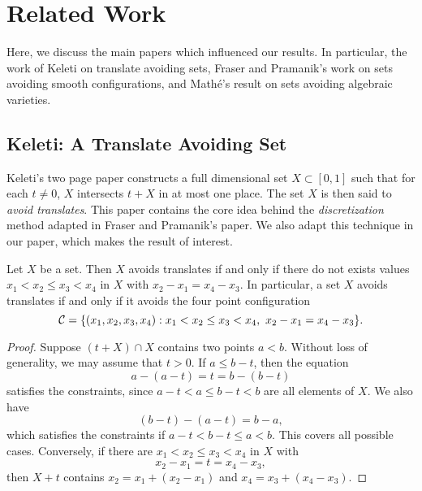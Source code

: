
\chapter{Related Work}
\label{ch:RelatedWork}

Here, we discuss the main papers which influenced our results. In particular, the work of Keleti on translate avoiding sets, Fraser and Pramanik's work on sets avoiding smooth configurations, and Math\'{e}'s result on sets avoiding algebraic varieties. 

\begin{comment}
and Schmerkin's result on sets with large Fourier dimension avoiding smooth configurations.
\end{comment}

\section{Keleti: A Translate Avoiding Set}

Keleti's two page paper constructs a full dimensional set $X \subset [0,1]$ such that for each $t \neq 0$, $X$ intersects $t + X$ in at most one place. The set $X$ is then said to \emph{avoid translates}. This paper contains the core idea behind the \emph{discretization} method adapted in Fraser and Pramanik's paper. We also adapt this technique in our paper, which makes the result of interest.

\begin{lemma}
    Let $X$ be a set. Then $X$ avoids translates if and only if there do not exists values $x_1 < x_2 \leq x_3 < x_4$ in $X$ with $x_2 - x_1 = x_4 - x_3$. In particular, a set $X$ avoids translates if and only if it avoids the four point configuration
    \[ \operatorname{\mathcal{C}} = \{ (x_1, x_2, x_3, x_4): x_1 < x_2 \leq x_3 < x_4,\ x_2 - x_1 = x_4 - x_3 \}. \]
\end{lemma}
\begin{proof}

    Suppose $(t + X) \cap X$ contains two points $a < b$. Without loss of generality, we may assume that $t > 0$. If $a \leq b - t$, then the equation
    \[ a - (a - t) = t = b - (b - t) \]
    satisfies the constraints, since $a - t < a \leq b - t < b$ are all elements of $X$. We also have
    \[ (b - t) - (a - t) = b - a, \]
    which satisfies the constraints if $a - t < b - t \leq a < b$. This covers all possible cases. Conversely, if there are $x_1 < x_2 \leq x_3 < x_4$ in $X$ with
    \[ x_2 - x_1 = t = x_4 - x_3, \]
    then $X + t$ contains $x_2 = x_1 + (x_2 - x_1)$ and $x_4 = x_3 + (x_4 - x_3)$.
\end{proof}

